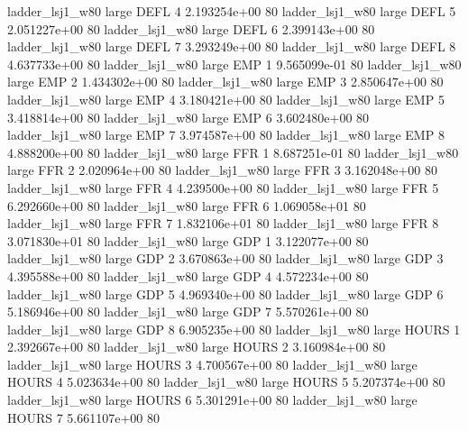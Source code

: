     ladder_lsj1_w80      large     DEFL                 4 2.193254e+00 80
    ladder_lsj1_w80      large     DEFL                 5 2.051227e+00 80
    ladder_lsj1_w80      large     DEFL                 6 2.399143e+00 80
    ladder_lsj1_w80      large     DEFL                 7 3.293249e+00 80
    ladder_lsj1_w80      large     DEFL                 8 4.637733e+00 80
    ladder_lsj1_w80      large      EMP                 1 9.565099e-01 80
    ladder_lsj1_w80      large      EMP                 2 1.434302e+00 80
    ladder_lsj1_w80      large      EMP                 3 2.850647e+00 80
    ladder_lsj1_w80      large      EMP                 4 3.180421e+00 80
    ladder_lsj1_w80      large      EMP                 5 3.418814e+00 80
    ladder_lsj1_w80      large      EMP                 6 3.602480e+00 80
    ladder_lsj1_w80      large      EMP                 7 3.974587e+00 80
    ladder_lsj1_w80      large      EMP                 8 4.888200e+00 80
    ladder_lsj1_w80      large      FFR                 1 8.687251e-01 80
    ladder_lsj1_w80      large      FFR                 2 2.020964e+00 80
    ladder_lsj1_w80      large      FFR                 3 3.162048e+00 80
    ladder_lsj1_w80      large      FFR                 4 4.239500e+00 80
    ladder_lsj1_w80      large      FFR                 5 6.292660e+00 80
    ladder_lsj1_w80      large      FFR                 6 1.069058e+01 80
    ladder_lsj1_w80      large      FFR                 7 1.832106e+01 80
    ladder_lsj1_w80      large      FFR                 8 3.071830e+01 80
    ladder_lsj1_w80      large      GDP                 1 3.122077e+00 80
    ladder_lsj1_w80      large      GDP                 2 3.670863e+00 80
    ladder_lsj1_w80      large      GDP                 3 4.395588e+00 80
    ladder_lsj1_w80      large      GDP                 4 4.572234e+00 80
    ladder_lsj1_w80      large      GDP                 5 4.969340e+00 80
    ladder_lsj1_w80      large      GDP                 6 5.186946e+00 80
    ladder_lsj1_w80      large      GDP                 7 5.570261e+00 80
    ladder_lsj1_w80      large      GDP                 8 6.905235e+00 80
    ladder_lsj1_w80      large    HOURS                 1 2.392667e+00 80
    ladder_lsj1_w80      large    HOURS                 2 3.160984e+00 80
    ladder_lsj1_w80      large    HOURS                 3 4.700567e+00 80
    ladder_lsj1_w80      large    HOURS                 4 5.023634e+00 80
    ladder_lsj1_w80      large    HOURS                 5 5.207374e+00 80
    ladder_lsj1_w80      large    HOURS                 6 5.301291e+00 80
    ladder_lsj1_w80      large    HOURS                 7 5.661107e+00 80

